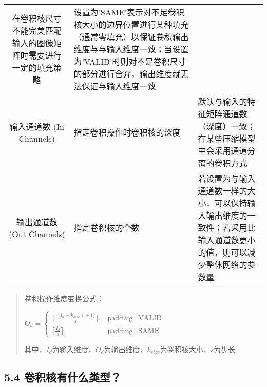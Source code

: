 \begin{longtable}[]{ cll }
\begin{minipage}[t]{0.38\columnwidth}
在卷积核尺寸不能完美匹配输入的图像矩阵时需要进行一定的填充策略\strut
\end{minipage} & \begin{minipage}[t]{0.38\columnwidth}\raggedright\strut
设置为'SAME'表示对不足卷积核大小的边界位置进行某种填充（通常零填充）以保证卷积输出维度与与输入维度一致；当设置为'VALID'时则对不足卷积尺寸的部分进行舍弃，输出维度就无法保证与输入维度一致\strut
\end{minipage}\tabularnewline
\begin{minipage}[t]{0.16\columnwidth}\centering\strut
输入通道数 (In Channels)\strut
\end{minipage} & \begin{minipage}[t]{0.38\columnwidth}\raggedright\strut
指定卷积操作时卷积核的深度\strut
\end{minipage} & \begin{minipage}[t]{0.38\columnwidth}\raggedright\strut
默认与输入的特征矩阵通道数（深度）一致；在某些压缩模型中会采用通道分离的卷积方式\strut
\end{minipage}\tabularnewline
\begin{minipage}[t]{0.16\columnwidth}\centering\strut
输出通道数 (Out Channels)\strut
\end{minipage} & \begin{minipage}[t]{0.38\columnwidth}\raggedright\strut
指定卷积核的个数\strut
\end{minipage} & \begin{minipage}[t]{0.38\columnwidth}\raggedright\strut
若设置为与输入通道数一样的大小，可以保持输入输出维度的一致性；若采用比输入通道数更小的值，则可以减少整体网络的参数量\strut
\end{minipage}\tabularnewline
\bottomrule
\end{longtable}

\begin{quote}
卷积操作维度变换公式：

\(O_d =\begin{cases} \lceil \frac{(I_d - k_{size})+ 1)}{s}\rceil ,& \text{padding=VALID}\\ \lceil \frac{I_d}{s}\rceil,&\text{padding=SAME} \end{cases}\)

其中，\(I_d\)为输入维度，\(O_d\)为输出维度，\(k_{size}\)为卷积核大小，\(s\)为步长
\end{quote}

\subsection{5.4
卷积核有什么类型？}\label{ux5377ux79efux6838ux6709ux4ec0ux4e48ux7c7bux578b}

